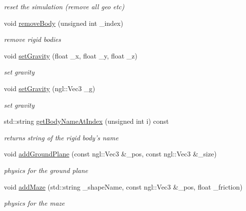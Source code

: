 \begin{DoxyCompactItemize}
\begin{DoxyCompactList}\small\item\em reset the simulation (remove all geo etc) \item\end{DoxyCompactList}\item 
void \hyperlink{classPhysicsWorld_af4360b1fd73bccb9daad2f0e2e010324}{removeBody} (unsigned int \_\-index)
\begin{DoxyCompactList}\small\item\em remove rigid bodies \item\end{DoxyCompactList}\item 
void \hyperlink{classPhysicsWorld_a0d04a6ac71656dbaa41394b3bfe9e4be}{setGravity} (float \_\-x, float \_\-y, float \_\-z)
\begin{DoxyCompactList}\small\item\em set gravity \item\end{DoxyCompactList}\item 
void \hyperlink{classPhysicsWorld_a2cdbd862a8cd35eed77772fa870a3d83}{setGravity} (ngl::Vec3 \_\-g)
\begin{DoxyCompactList}\small\item\em set gravity \item\end{DoxyCompactList}\item 
std::string \hyperlink{classPhysicsWorld_a68a706855bc60f6d404cfbab4ca0d8fa}{getBodyNameAtIndex} (unsigned int i) const 
\begin{DoxyCompactList}\small\item\em returns string of the rigid body's name \item\end{DoxyCompactList}\item 
void \hyperlink{classPhysicsWorld_af3c1088adc3402dccd48098468805008}{addGroundPlane} (const ngl::Vec3 \&\_\-pos, const ngl::Vec3 \&\_\-size)
\begin{DoxyCompactList}\small\item\em physics for the ground plane \item\end{DoxyCompactList}\item 
void \hyperlink{classPhysicsWorld_a18e222c2a3b752a4ca79534affc26677}{addMaze} (std::string \_\-shapeName, const ngl::Vec3 \&\_\-pos, float \_\-friction)
\begin{DoxyCompactList}\small\item\em physics for the maze \item\end{DoxyCompactList}\item 

\end{DoxyCompactItemize}
